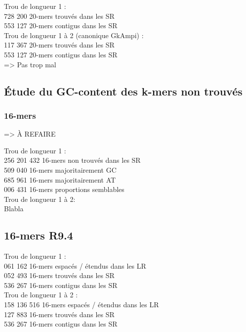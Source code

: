 \documentclass[12pt]{article}
\begin{document}
Trou de longueur 1 : \\
 728 200 20-mers trouvés dans les SR \\
 553 127 20-mers contigus dans les SR \\

Trou de longueur 1 à 2 (canonique GkAmpi) : \\
 117 367 20-mers trouvés dans les SR \\
 553 127 20-mers contigus dans les SR \\

=> Pas trop mal

\subsection{Étude du GC-content des k-mers non trouvés}

\subsubsection{16-mers}

=> À REFAIRE

Trou de longueur 1 : \\
256 201 432 16-mers non trouvés dans les SR \\
 509 040 16-mers majoritairement GC \\
 685 961 16-mers majoritairement AT \\
 006 431 16-mers proportions semblables \\

Trou de longueur 1 à 2: \\
Blabla

\subsection{16-mers R9.4}

\indent Trou de longueur 1 : \\
 061 162 16-mers espacés / étendus dans les LR \\
 052 493 16-mers trouvés dans les SR \\
 536 267 16-mers contigus dans les SR \\

\indent Trou de longueur 1 à 2 : \\
 158 136 516 16-mers espacés / étendus dans les LR \\
 127 883 16-mers trouvés dans les SR \\
 536 267 16-mers contigus dans les SR \\
\end{document}

